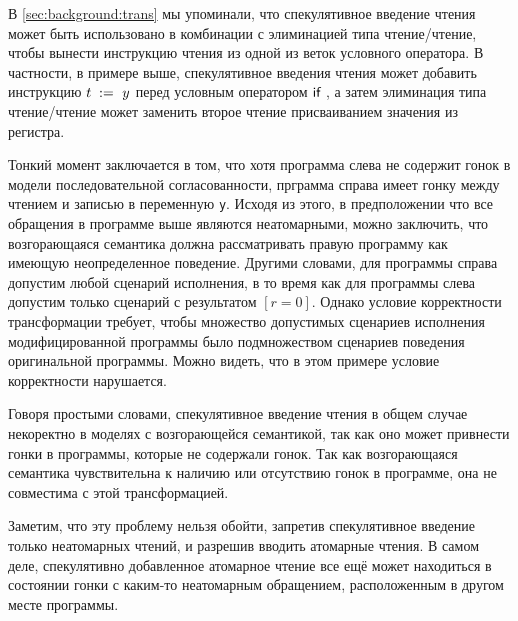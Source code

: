 В \cref{sec:background:trans} мы упоминали, 
что спекулятивное введение чтения может быть 
использовано в комбинации с элиминацией 
типа чтение/чтение, чтобы вынести инструкцию чтения
из одной из веток условного оператора. 
В частности, в примере выше, 
спекулятивное введения чтения может добавить 
инструкцию $t\;:=_{}\;y$ перед условным оператором $\textsf{if}~$, 
а затем элиминация типа чтение/чтение может заменить 
второе чтение присваиванием значения из регистра. 

Тонкий момент заключается в том, что хотя 
программа слева не содержит гонок в модели 
последовательной согласованности, 
прграмма справа имеет гонку между 
чтением и записью в переменную \texttt{y}.
Исходя из этого, в предположении что все 
обращения в программе выше являются неатомарными, 
можно заключить, что возгорающаяся семантика 
должна рассматривать правую программу как 
имеющую неопределенное поведение. 
Другими словами, для программы справа 
допустим любой сценарий исполнения, 
в то время как для программы слева 
допустим только сценарий с результатом ${[r=0]}$.
Однако условие корректности трансформации требует, 
чтобы множество допустимых сценариев исполнения 
модифицированной программы было подмножеством 
сценариев поведения оригинальной программы. 
Можно видеть, что в этом примере условие корректности нарушается. 

Говоря простыми словами, спекулятивное введение чтения 
в общем случае некоректно в моделях с возгорающейся семантикой,
так как оно может привнести гонки в программы, 
которые не содержали гонок. 
Так как возгорающаяся семантика чувствительна 
к наличию или отсутствию гонок в программе, 
она не совместима с этой трансформацией. 

Заметим, что эту проблему нельзя обойти, 
запретив спекулятивное введение только неатомарных чтений, 
и разрешив вводить атомарные чтения. 
В самом деле, спекулятивно добавленное атомарное чтение
все ещё может находиться в состоянии гонки с 
каким-то неатомарным обращением, расположенным 
в другом месте программы. 
